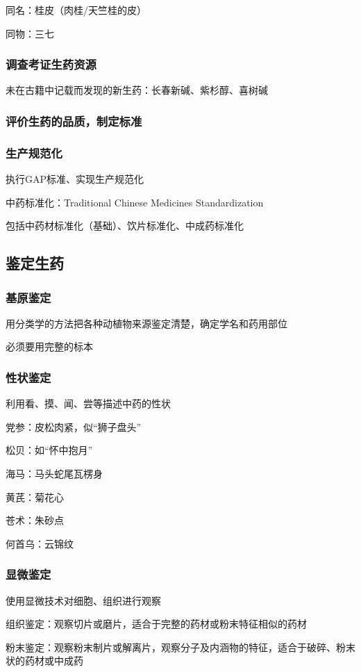 
同名：桂皮（肉桂/天竺桂的皮）

同物：三七
\subsubsection*{调查考证生药资源}%
\label{subsub:调查考证生药资源}
未在古籍中记载而发现的新生药：长春新碱、紫杉醇、喜树碱

\subsubsection*{评价生药的品质，制定标准}%
\label{subsub:评价生药的品质-制定标准}

\subsubsection*{生产规范化}%
\label{subsub:生产规范化}
执行GAP标准、实现生产规范化
\begin{defi}
    中药标准化：Traditional Chinese Medicines Standardization

    包括中药材标准化（基础）、饮片标准化、中成药标准化
\end{defi}

\subsection{鉴定生药}%
\label{sub:鉴定生药}
\subsubsection*{基原鉴定}%
\label{subsub:基原鉴定}
用分类学的方法把各种动植物来源鉴定清楚，确定学名和药用部位
\begin{notation}
    必须要用完整的标本
\end{notation}
\subsubsection*{性状鉴定}%
\label{subsub:性状鉴定}
利用看、摸、闻、尝等描述中药的性状
\begin{eg}
    党参：皮松肉紧，似“狮子盘头”

    松贝：如“怀中抱月”

    海马：马头蛇尾瓦楞身

    黄芪：菊花心

    苍术：朱砂点

    何首乌：云锦纹
\end{eg}
\subsubsection*{显微鉴定}%
\label{subsub:显微鉴定}
使用显微技术对细胞、组织进行观察
\begin{notation}
    组织鉴定：观察切片或磨片，适合于完整的药材或粉末特征相似的药材

    粉末鉴定：观察粉末制片或解离片，观察分子及内涵物的特征，适合于破碎、粉末状的药材或中成药
\end{notation}
